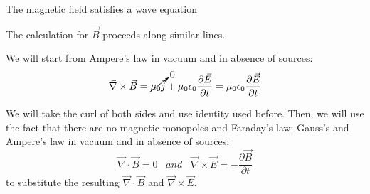\begin{frame}{The magnetic field satisfies a wave equation}

The calculation for $\vec{B}$ proceeds along similar lines.\\
\vspace{0.2cm}

We will start from Ampere's law in vacuum and in absence of sources:
\begin{equation*}
  \vec{\nabla} \times \vec{B} =
        \cancelto{0}{\mu_0 \vec{j}} + \mu_0 \epsilon_0 \frac{\partial \vec{E}}{\partial t} =
        \mu_0 \epsilon_0 \frac{\partial \vec{E}}{\partial t}
\end{equation*}

We will take the curl of both sides and use identity used before.
Then, we will use the fact that there are no magnetic monopoles and Faraday's law:
Gauss's and Ampere's law in vacuum and in absence of sources:
\begin{equation*}
  \vec{\nabla} \cdot \vec{B} = 0
  \;\;\; and \;\;\;
  \vec{\nabla} \times \vec{E} = - \frac{\partial \vec{B}}{\partial t}
\end{equation*}
to substitute the resulting $\vec{\nabla} \cdot \vec{B}$  and $\vec{\nabla} \times \vec{E}$.


\end{frame}


%
%
%
%

